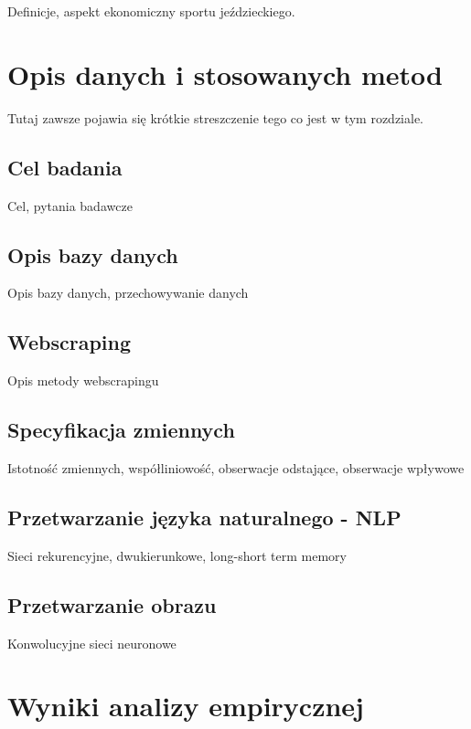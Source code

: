 \documentclass[polish, twoside, 12pt, a4paper]{article}
\theoremstyle{definition}
\theoremstyle{plain}
\theoremstyle{remark}
\begin{document}
Definicje, aspekt ekonomiczny sportu jeździeckiego.

\clearpage
\section{Opis danych i stosowanych metod}

Tutaj zawsze pojawia się krótkie streszczenie tego co jest w tym rozdziale.

\subsection{Cel badania}

Cel, pytania badawcze

\subsection{Opis bazy danych}

Opis bazy danych, przechowywanie danych

\subsection{Webscraping}

Opis metody webscrapingu

\subsection{Specyfikacja zmiennych}

Istotność zmiennych, współliniowość, obserwacje odstające, obserwacje wpływowe

\subsection{Przetwarzanie języka naturalnego - NLP}

Sieci rekurencyjne, dwukierunkowe, long-short term memory

\subsection{Przetwarzanie obrazu}

Konwolucyjne sieci neuronowe

\clearpage
\section{Wyniki analizy empirycznej}
\end{document}

